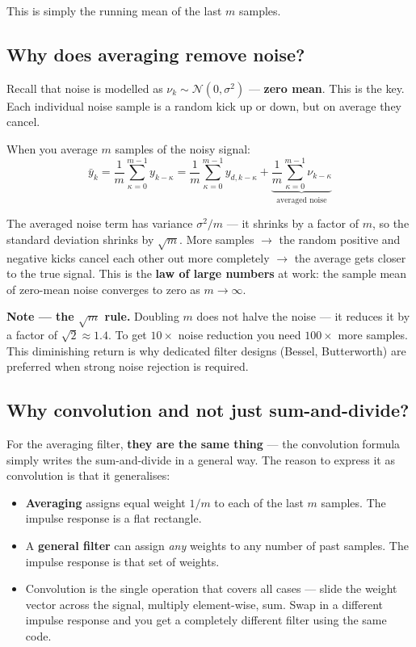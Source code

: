 \documentclass[12pt, a4paper]{article}
\begin{document}
This is simply the running mean of the last $m$ samples.

\subsection*{Why does averaging remove noise?}

Recall that noise is modelled as $\nu_k \sim \mathcal{N}(0, \sigma^2)$
--- \textbf{zero mean}. This is the key. Each individual noise sample
is a random kick up or down, but on average they cancel.

When you average $m$ samples of the noisy signal:
\[
  \bar{y}_k = \frac{1}{m}\sum_{\kappa=0}^{m-1} y_{k-\kappa}
  = \frac{1}{m}\sum_{\kappa=0}^{m-1} y_{d,k-\kappa}
  + \underbrace{\frac{1}{m}\sum_{\kappa=0}^{m-1} \nu_{k-\kappa}}_{\text{averaged noise}}
\]

The averaged noise term has variance $\sigma^2 / m$ --- it shrinks by a
factor of $m$, so the standard deviation shrinks by $\sqrt{m}$.
More samples $\to$ the random positive and negative kicks cancel each
other out more completely $\to$ the average gets closer to the true signal.
This is the \textbf{law of large numbers} at work: the sample mean of
zero-mean noise converges to zero as $m \to \infty$.

\begin{notebox}
  \textbf{Note --- the $\sqrt{m}$ rule.} Doubling $m$ does not halve the
  noise --- it reduces it by a factor of $\sqrt{2} \approx 1.4$. To get
  $10\times$ noise reduction you need $100\times$ more samples. This
  diminishing return is why dedicated filter designs (Bessel, Butterworth)
  are preferred when strong noise rejection is required.
\end{notebox}

\subsection*{Why convolution and not just sum-and-divide?}

For the averaging filter, \textbf{they are the same thing} --- the
convolution formula simply writes the sum-and-divide in a general way.
The reason to express it as convolution is that it generalises:

\begin{itemize}[leftmargin=1.5em]
  \item \textbf{Averaging} assigns equal weight $1/m$ to each of the
        last $m$ samples. The impulse response is a flat rectangle.
  \item A \textbf{general filter} can assign \emph{any} weights to any
        number of past samples. The impulse response is that set of
        weights.
  \item Convolution is the single operation that covers all cases ---
        slide the weight vector across the signal, multiply element-wise,
        sum. Swap in a different impulse response and you get a completely
        different filter using the same code.
\end{itemize}
\end{document}
